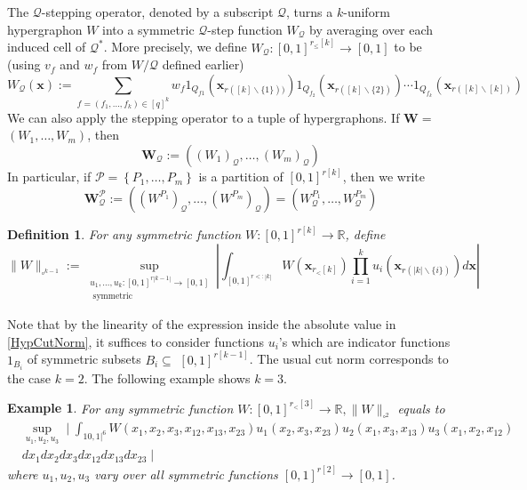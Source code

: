 \documentclass[11pt]{article}
\newtheorem{definition}[theorem]{Definition}
\newtheorem{example}[theorem]{Example}
\begin{document}
The $\mathcal{Q}$-stepping operator, denoted by a subscript $\mathcal{Q}$, turns a $k$-uniform hypergraphon $W$ into a symmetric $\mathcal{Q}$-step function $W_{\mathcal{Q}}$ by averaging over each induced cell of $\mathcal{Q}^*$. More precisely, we define $W_{\mathcal{Q}}:[0,1]^{r_{\leq}[k]} \rightarrow[0,1]$ to be (using $v_f$ and $w_f$ from $W / \mathcal{Q}$ defined earlier)
$$
W_{\mathcal{Q}}(\mathbf{x}):=\sum_{f=\left(f_1, \ldots, f_k\right) \in [q]^k} w_f 1_{Q_{f 1}}\left(\mathbf{x}_{r([k] \backslash\{1\}))}\right) 1_{Q_{f_2}}\left(\mathbf{x}_{r([k] \backslash \{2\} )}\right) \cdots 1_{Q_{f_k}}\left(\mathbf{x}_{r([k] \backslash [k])}\right)
$$
We can also apply the stepping operator to a tuple of hypergraphons. If $\mathbf{W}=$ $\left(W_1, \ldots, W_m\right)$, then
$$
\mathbf{W}_{\mathcal{Q}}:=\left(\left(W_1\right)_{\mathcal{Q}}, \ldots,\left(W_m\right)_{\mathcal{Q}}\right)
$$
In particular, if $\mathcal{P}=\left\{P_1, \ldots, P_m\right\}$ is a partition of $[0,1]^{r [ k]}$, then we write
$$
\mathbf{W}_{\mathcal{Q}}^{\mathcal{P}}:=\left(\left(W^{P_1}\right)_{\mathcal{Q}}, \ldots,\left(W^{P_m}\right)_{\mathcal{Q}}\right)=\left(W_{\mathcal{Q}}^{P_1}, \ldots, W_{\mathcal{Q}}^{P_m}\right)
$$
\begin{definition}
 For any symmetric function $W:[0,1]^{r[k]} \rightarrow \mathbb{R}$, define
\begin{equation}\label{HypCutNorm}
\|W\|_{\square^{k-1}}:=\sup _{\substack{u_1, \ldots, u_k:[0,1]^{r|k-1|} \rightarrow[0,1] \\ \text { symmetric }}}\left|\int_{[0,1]^{r<:|k|}} W\left(\mathbf{x}_{r_<[k]}\right) \prod_{i=1}^k u_i\left(\mathbf{x}_{r(|k| \backslash\{i\})}\right) d \mathbf{x}\right|\end{equation}
\end{definition}
Note that by the linearity of the expression inside the absolute value in \eqref{HypCutNorm}, it suffices to consider functions $u_i$'s which are indicator functions $1_{B_i}$ of symmetric subsets $B_i \subseteq$ $[0,1]^{r [ k-1]}$. The usual cut norm corresponds to the case $k=2$. The following example shows $k=3$.
\begin{example}
For any symmetric function $W:[0,1]^{r_{<}[3]} \rightarrow \mathbb{R},\|W\|_{\square^2}$ equals to
$$
\begin{aligned}
&\sup _{u_1, u_2, u_3} \mid \int_{10,\left.1\right|^6} W\left(x_1, x_2, x_3, x_{12}, x_{13}, x_{23}\right) u_1\left(x_2, x_3, x_{23}\right) u_2\left(x_1, x_3, x_{13}\right) u_3\left(x_1, x_2, x_{12}\right) \\
&d x_1 d x_2 d x_3 d x_{12} d x_{13} d x_{23} \mid
\end{aligned}
$$
where $u_1, u_2, u_3$ vary over all symmetric functions $[0,1]^{r[2]} \rightarrow[0,1]$.
\end{example} 
\end{document}
